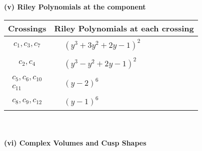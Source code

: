 \documentclass[1p]{elsarticle_modified}
\theoremstyle{definition}
\begin{document}
\newpage\renewcommand{\arraystretch}{1}
\flushleft \textbf{(v) Riley Polynomials at the component}\newline \\
\begin{tabular}{m{50pt}|m{274pt}}
Crossings & \hspace{64pt}Riley Polynomials at each crossing \\
\hline $$\begin{aligned}c_{1},c_{3},c_{7}\end{aligned}$$&$\begin{aligned}
&(y^3+3 y^2+2 y-1)^2
\end{aligned}$\\
\hline $$\begin{aligned}c_{2},c_{4}\end{aligned}$$&$\begin{aligned}
&(y^3- y^2+2 y-1)^2
\end{aligned}$\\
\hline $$\begin{aligned}c_{5},c_{6},c_{10}\\c_{11}\end{aligned}$$&$\begin{aligned}
&(y-2)^6
\end{aligned}$\\
\hline $$\begin{aligned}c_{8},c_{9},c_{12}\end{aligned}$$&$\begin{aligned}
&(y-1)^6
\end{aligned}$\\
\hline
\end{tabular}\\~\\
\newpage\flushleft \textbf{(vi) Complex Volumes and Cusp Shapes}
\end{document}

